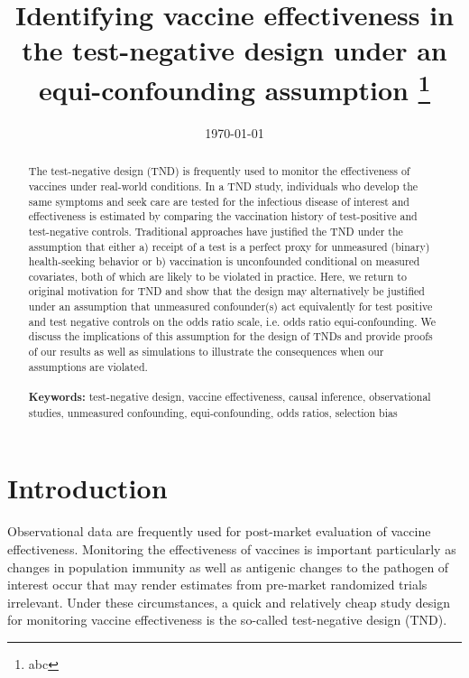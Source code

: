 \documentclass[11pt]{article}
\begin{document}
\begin{titlepage}
\title{Identifying vaccine effectiveness in the test-negative design under an equi-confounding assumption \thanks{abc}}
\author[1]{ }
\date{\today}
\maketitle

\begin{abstract}
    The test-negative design (TND) is frequently used to monitor the effectiveness of vaccines under real-world conditions. In a TND study, individuals who develop the same symptoms and seek care are tested for the infectious disease of interest and effectiveness is estimated by comparing the vaccination history of test-positive and test-negative controls. Traditional approaches have justified the TND under the assumption that either a) receipt of a test is a perfect proxy for unmeasured (binary) health-seeking behavior or b) vaccination is unconfounded conditional on measured covariates, both of which are likely to be violated in practice. Here, we return to original motivation for TND and show that the design may alternatively be justified under an assumption that unmeasured confounder(s) act equivalently for test positive and test negative controls on the odds ratio scale, i.e. odds ratio equi-confounding. We discuss the implications of this assumption for the design of TNDs and provide proofs of our results as well as simulations to illustrate the consequences when our assumptions are violated.
\noindent \\
\vspace{0in} \\
\noindent\textbf{Keywords:} test-negative design, vaccine effectiveness, causal inference, observational studies, unmeasured confounding, equi-confounding, odds ratios, selection bias
\bigskip
\end{abstract}
\setcounter{page}{0}
\thispagestyle{empty}
\end{titlepage}
\pagebreak \newpage

\doublespacing

\section{Introduction} \label{sec:introduction}
Observational data are frequently used for post-market evaluation of vaccine effectiveness. Monitoring the effectiveness of vaccines is important particularly as changes in population immunity as well as antigenic changes to the pathogen of interest occur that may render estimates from pre-market randomized trials irrelevant. Under these circumstances, a quick and relatively cheap study design for monitoring vaccine effectiveness is the so-called test-negative design (TND). 
\end{document}
